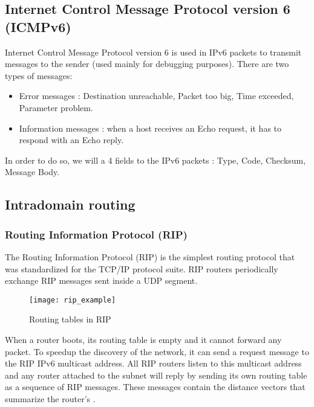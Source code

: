 \subsection[ICMPv6]{Internet Control Message Protocol version 6 (ICMPv6)}

Internet Control Message Protocol version 6 is used in IPv6 packets to transmit messages to the sender (used mainly for debugging purposes). There are two types of messages:
\begin{itemize}
\item Error messages : Destination unreachable, Packet too big, Time exceeded, Parameter problem.
\item Information messages : when a host receives an Echo request, it has to respond with an Echo reply.
\end{itemize}

In order to do so, we will a 4 fields to the IPv6 packets : Type, Code, Checksum, Message Body.

\subsection{Intradomain routing}

\subsubsection[RIP]{Routing Information Protocol (RIP)}

The Routing Information Protocol (RIP) is the simplest routing protocol that was standardized for the TCP/IP protocol suite. RIP routers periodically exchange RIP messages sent inside a UDP segment.

\begin{minipage}{0.55\textwidth}
	\begin{figure}[H]
		\centering
		\texttt{[image: rip\_example]}
		\caption{Routing tables in RIP}
	\end{figure}
\end{minipage}
\begin{minipage}{0.44\textwidth}
	When a router boots, its routing table is empty and it cannot forward any packet. To speedup the discovery of the network, it can send a request message to the RIP IPv6 multicast address. All RIP routers listen to this multicast address and any router attached to the subnet will reply by sending its own routing table as a sequence of RIP messages. These messages contain the distance vectors that summarize the router’s .
\end{minipage}

